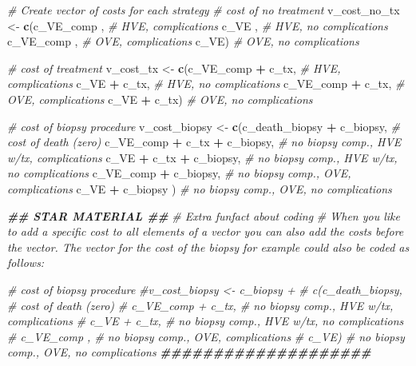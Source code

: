 \documentclass[
]{article}
\newenvironment{Shaded}{\begin{snugshade}}{\end{snugshade}}
\newcommand{\CommentTok}[1]{\textcolor[rgb]{0.56,0.35,0.01}{\textit{#1}}}
\newcommand{\DocumentationTok}[1]{\textcolor[rgb]{0.56,0.35,0.01}{\textbf{\textit{#1}}}}
\newcommand{\FunctionTok}[1]{\textcolor[rgb]{0.13,0.29,0.53}{\textbf{#1}}}
\newcommand{\NormalTok}[1]{#1}
\newcommand{\OtherTok}[1]{\textcolor[rgb]{0.56,0.35,0.01}{#1}}
\newcommand{\SpecialCharTok}[1]{\textcolor[rgb]{0.81,0.36,0.00}{\textbf{#1}}}
\begin{document}
\begin{Shaded}
\begin{Highlighting}[]
\CommentTok{\# Create vector of costs for each strategy }
\CommentTok{\# cost of no treatment }
\NormalTok{v\_cost\_no\_tx  }\OtherTok{\textless{}{-}} \FunctionTok{c}\NormalTok{(c\_VE\_comp ,          }\CommentTok{\# HVE, complications}
\NormalTok{                   c\_VE      ,          }\CommentTok{\# HVE, no complications}
\NormalTok{                   c\_VE\_comp ,          }\CommentTok{\# OVE, complications}
\NormalTok{                   c\_VE)                }\CommentTok{\# OVE, no complications}

\CommentTok{\# cost of treatment}
\NormalTok{v\_cost\_tx     }\OtherTok{\textless{}{-}} \FunctionTok{c}\NormalTok{(c\_VE\_comp }\SpecialCharTok{+}\NormalTok{ c\_tx,    }\CommentTok{\# HVE, complications}
\NormalTok{                   c\_VE      }\SpecialCharTok{+}\NormalTok{ c\_tx,    }\CommentTok{\# HVE, no complications}
\NormalTok{                   c\_VE\_comp }\SpecialCharTok{+}\NormalTok{ c\_tx,    }\CommentTok{\# OVE, complications}
\NormalTok{                   c\_VE      }\SpecialCharTok{+}\NormalTok{ c\_tx)  }\CommentTok{\# OVE, no complications}

\CommentTok{\# cost of biopsy procedure}
\NormalTok{v\_cost\_biopsy }\OtherTok{\textless{}{-}} \FunctionTok{c}\NormalTok{(c\_death\_biopsy   }\SpecialCharTok{+}\NormalTok{ c\_biopsy,   }\CommentTok{\# cost of death (zero)}
\NormalTok{                   c\_VE\_comp }\SpecialCharTok{+}\NormalTok{ c\_tx }\SpecialCharTok{+}\NormalTok{ c\_biopsy,   }\CommentTok{\# no biopsy comp., HVE w/tx, complications }
\NormalTok{                   c\_VE      }\SpecialCharTok{+}\NormalTok{ c\_tx }\SpecialCharTok{+}\NormalTok{ c\_biopsy,   }\CommentTok{\# no biopsy comp., HVE w/tx, no complications}
\NormalTok{                   c\_VE\_comp        }\SpecialCharTok{+}\NormalTok{ c\_biopsy,   }\CommentTok{\# no biopsy comp., OVE, complications}
\NormalTok{                   c\_VE             }\SpecialCharTok{+}\NormalTok{ c\_biopsy )  }\CommentTok{\# no biopsy comp., OVE, no complications}
 
\DocumentationTok{\#\# STAR MATERIAL \#\#  }
\CommentTok{\# Extra funfact about coding}
\CommentTok{\# When you like to add a specific cost to all elements of a vector you can also add the costs before the vector. The vector for the cost of the biopsy for example could also be coded as follows:}

\CommentTok{\# cost of biopsy procedure}
\CommentTok{\#v\_cost\_biopsy \textless{}{-} c\_biopsy + }
\CommentTok{\#                    c(c\_death\_biopsy,     \# cost of death (zero)}
\CommentTok{\#                      c\_VE\_comp + c\_tx,   \# no biopsy comp., HVE w/tx, complications }
\CommentTok{\#                      c\_VE      + c\_tx,   \# no biopsy comp., HVE w/tx, no complications}
\CommentTok{\#                      c\_VE\_comp       ,   \# no biopsy comp., OVE, complications}
\CommentTok{\#                      c\_VE)               \# no biopsy comp., OVE, no complications}
\DocumentationTok{\#\#\#\#\#\#\#\#\#\#\#\#\#\#\#\#\#\#\#\#}
\end{Highlighting}
\end{Shaded}
\end{document}
